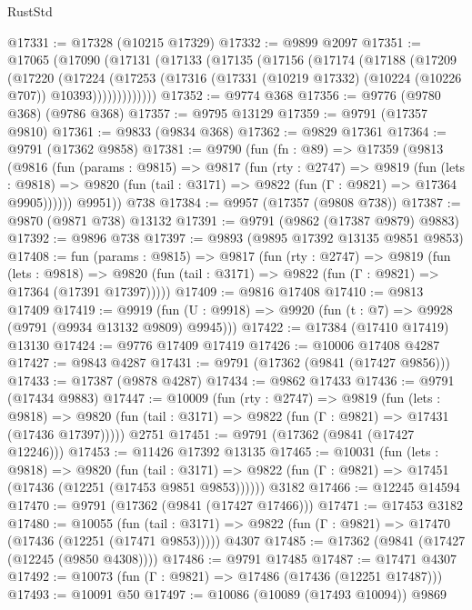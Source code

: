 \begin{lexlean}{RustStd}
\begin{coremodule}
@17331 := @17328 (@10215 @17329)
@17332 := @9899 @2097
@17351 := @17065
    (@17090
      (@17131
        (@17133
          (@17135
            (@17156
              (@17174
                (@17188
                  (@17209
                    (@17220
                      (@17224
                        (@17253
                          (@17316 (@17331 (@10219 @17332) (@10224 (@10226 @707)) @10393)))))))))))))
@17352 := @9774 @368
@17356 := @9776 (@9780 @368) (@9786 @368)
@17357 := @9795 @13129
@17359 := @9791 (@17357 @9810)
@17361 := @9833 (@9834 @368)
@17362 := @9829 @17361
@17364 := @9791 (@17362 @9858)
@17381 := @9790
    (fun (fn : @89) =>
    @17359
      (@9813
        (@9816
          (fun (params : @9815) =>
          @9817
            (fun (rty : @2747) =>
            @9819
              (fun (lets : @9818) =>
              @9820 (fun (tail : @3171) => @9822 (fun (Γ : @9821) => @17364 @9905))))))
        @9951))
    @738
@17384 := @9957 (@17357 (@9808 @738))
@17387 := @9870 (@9871 @738) @13132
@17391 := @9791 (@9862 (@17387 @9879) @9883)
@17392 := @9896 @738
@17397 := @9893 (@9895 @17392 @13135 @9851 @9853)
@17408 := fun (params : @9815) =>
  @9817
    (fun (rty : @2747) =>
    @9819
      (fun (lets : @9818) =>
      @9820 (fun (tail : @3171) => @9822 (fun (Γ : @9821) => @17364 (@17391 @17397)))))
@17409 := @9816 @17408
@17410 := @9813 @17409
@17419 := @9919
    (fun (U : @9918) => @9920 (fun (t : @7) => @9928 (@9791 (@9934 @13132 @9809) @9945)))
@17422 := @17384 (@17410 @17419) @13130
@17424 := @9776 @17409 @17419
@17426 := @10006 @17408 @4287
@17427 := @9843 @4287
@17431 := @9791 (@17362 (@9841 (@17427 @9856)))
@17433 := @17387 (@9878 @4287)
@17434 := @9862 @17433
@17436 := @9791 (@17434 @9883)
@17447 := @10009
    (fun (rty : @2747) =>
    @9819
      (fun (lets : @9818) =>
      @9820 (fun (tail : @3171) => @9822 (fun (Γ : @9821) => @17431 (@17436 @17397)))))
    @2751
@17451 := @9791 (@17362 (@9841 (@17427 @12246)))
@17453 := @11426 @17392 @13135
@17465 := @10031
    (fun (lets : @9818) =>
    @9820
      (fun (tail : @3171) =>
      @9822 (fun (Γ : @9821) => @17451 (@17436 (@12251 (@17453 @9851 @9853))))))
    @3182
@17466 := @12245 @14594
@17470 := @9791 (@17362 (@9841 (@17427 @17466)))
@17471 := @17453 @3182
@17480 := @10055
    (fun (tail : @3171) => @9822 (fun (Γ : @9821) => @17470 (@17436 (@12251 (@17471 @9853)))))
    @4307
@17485 := @17362 (@9841 (@17427 (@12245 (@9850 @4308))))
@17486 := @9791 @17485
@17487 := @17471 @4307
@17492 := @10073 (fun (Γ : @9821) => @17486 (@17436 (@12251 @17487)))
@17493 := @10091 @50
@17497 := @10086 (@10089 (@17493 @10094)) @9869

\end{coremodule}
\end{lexlean}
